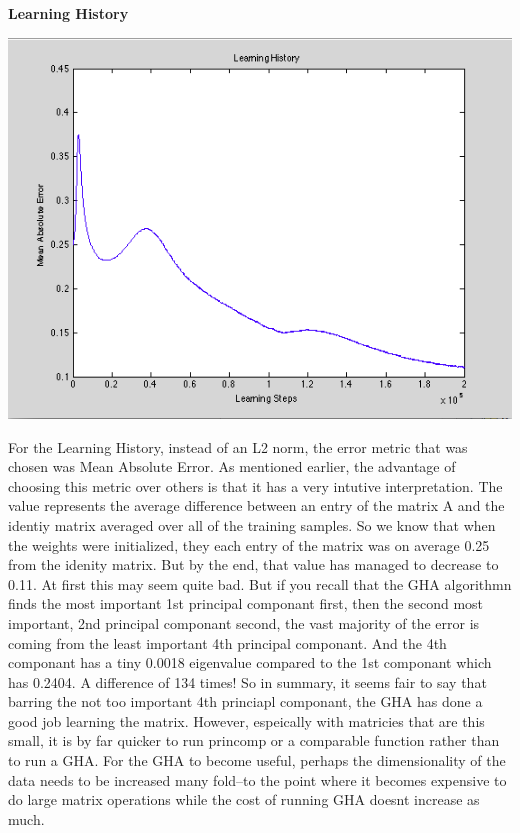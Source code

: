 \documentclass[epsfig]{article}
\begin{document}
\newpage
\textbf{Learning History}
\begin{center}
\includegraphics[scale=0.7]{pic6.png}
\end{center}
For the Learning History, instead of an L2 norm, the error metric that was chosen was Mean Absolute Error. As mentioned earlier, the advantage of choosing this metric over others is that it has a very intutive interpretation. The value represents the average difference between an entry of the matrix A and the identiy matrix averaged over all of the training samples. So we know that when the weights were initialized, they each entry of the matrix was on average 0.25 from the idenity matrix. But by the end, that value has managed to decrease to 0.11. At first this may seem quite bad. But if you recall that the GHA algorithmn finds the most important 1st principal componant first, then the second most important, 2nd principal componant second, the vast majority of the error is coming from the least important 4th principal componant. And the 4th componant has a tiny 0.0018 eigenvalue compared to the 1st componant which has 0.2404. A difference of 134 times! So in summary, it seems fair to say that barring the not too important 4th princiapl componant, the GHA has done a good job learning the matrix. However, espeically with matricies that are this small, it is by far quicker to run princomp or a comparable function rather than to run a GHA. For the GHA to become useful, perhaps the dimensionality of the data needs to be increased many fold--to the point where it becomes expensive to do large matrix operations while the cost of running GHA doesnt increase as much.
\end{document}
